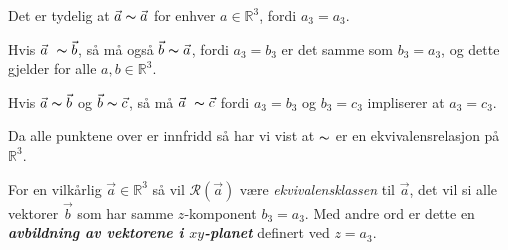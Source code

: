 \documentclass[a4paper,norsk,twocolumn,11pt]{article}
\begin{document}

Det er tydelig at $\vec{a} \thicksim \vec{a}$ for enhver $a\in \mathbb{R}^3$,
fordi $a_3=a_3$.

Hvis $\vec{a} \thicksim \vec{b}$, så må også $\vec{b} \thicksim \vec{a}$, fordi
$a_3=b_3$ er det samme som $b_3=a_3$, og dette gjelder for alle $a,b \in
\mathbb{R}^3$.

Hvis $\vec{a} \thicksim \vec{b}$ og $\vec{b} \thicksim \vec{c}$, så må
$\vec{a} \thicksim \vec{c}$ fordi $a_3=b_3$ og $b_3=c_3$ impliserer at
$a_3=c_3$.

Da alle punktene over er innfridd så har vi vist at $\thicksim$ er en
ekvivalensrelasjon på $\mathbb{R}^3$.


For en vilkårlig $\vec{a} \in \mathbb{R}^3$ så vil $\mathscr{R}(\vec{a})$ være
\textit{ekvivalensklassen} til $\vec{a}$, det vil si alle vektorer $\vec{b}$
som har samme $z$-komponent $b_3=a_3$. Med andre ord er dette en
\textbf{\textit{avbildning av vektorene i $xy$-planet}}
definert ved $z=a_3$.
\end{document}
